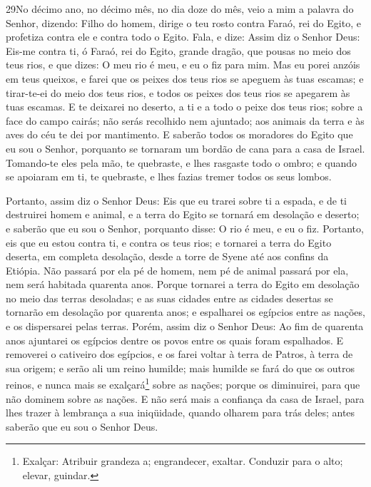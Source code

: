 \medskip

\lettrine{29} No décimo ano, no décimo mês, no dia doze do
mês, veio a mim a palavra do Senhor, dizendo: Filho do homem,
dirige o teu rosto contra Faraó, rei do Egito, e profetiza contra
ele e contra todo o Egito. Fala, e dize: Assim diz o Senhor
Deus: Eis-me contra ti, ó Faraó, rei do Egito, grande dragão, que
pousas no meio dos teus rios, e que dizes: O meu rio é meu, e eu o
fiz para mim. Mas eu porei anzóis em teus queixos, e farei que
os peixes dos teus rios se apeguem às tuas escamas; e tirar-te-ei do
meio dos teus rios, e todos os peixes dos teus rios se apegarem às
tuas escamas. E te deixarei no deserto, a ti e a todo o peixe
dos teus rios; sobre a face do campo cairás; não serás recolhido nem
ajuntado; aos animais da terra e às aves do céu te dei por
mantimento. E saberão todos os moradores do Egito que eu sou o
Senhor, porquanto se tornaram um bordão de cana para a casa de
Israel. Tomando-te eles pela mão, te quebraste, e lhes rasgaste
todo o ombro; e quando se apoiaram em ti, te quebraste, e lhes
fazias tremer todos os seus lombos.

Portanto, assim diz o Senhor Deus: Eis que eu trarei sobre ti a
espada, e de ti destruirei homem e animal, e a terra do Egito se
tornará em desolação e deserto; e saberão que eu sou o Senhor,
porquanto disse: O rio é meu, e eu o fiz. Portanto, eis que
eu estou contra ti, e contra os teus rios; e tornarei a terra do
Egito deserta, em completa desolação, desde a torre de Syene até aos
confins da Etiópia. Não passará por ela pé de homem, nem pé
de animal passará por ela, nem será habitada quarenta anos.
Porque tornarei a terra do Egito em desolação no meio das
terras desoladas; e as suas cidades entre as cidades desertas se
tornarão em desolação por quarenta anos; e espalharei os egípcios
entre as nações, e os dispersarei pelas terras. Porém, assim
diz o Senhor Deus: Ao fim de quarenta anos ajuntarei os egípcios
dentre os povos entre os quais foram espalhados. E removerei
o cativeiro dos egípcios, e os farei voltar à terra de Patros, à
terra de sua origem; e serão ali um reino humilde; mais
humilde se fará do que os outros reinos, e nunca mais se
exalçará\footnote{Exalçar: Atribuir grandeza a; engrandecer,
exaltar. Conduzir para o alto; elevar, guindar.} sobre as nações;
porque os diminuirei, para que não dominem sobre as nações. E
não será mais a confiança da casa de Israel, para lhes trazer à
lembrança a sua iniqüidade, quando olharem para trás deles; antes
saberão que eu sou o Senhor Deus.

